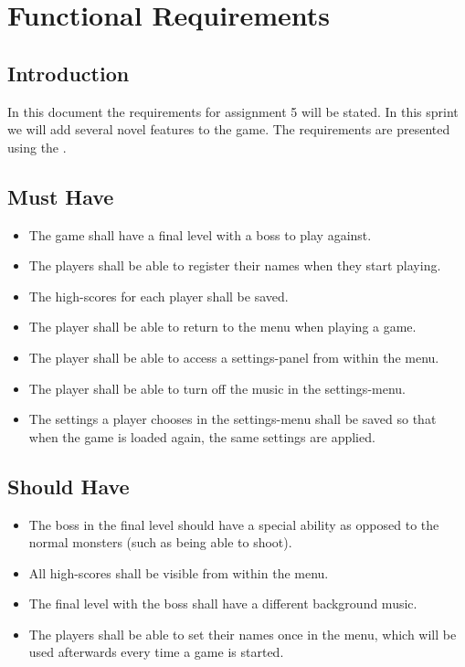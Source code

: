 \chapter{Functional Requirements}

\section{Introduction}
In this document the requirements for assignment 5 will be stated. In this sprint we will add several novel features to the game. \noindent The requirements are presented using the .

\section{Must Have}
\begin{itemize}
\itemsep0em
\item The game shall have a final level with a boss to play against. 
\item The players shall be able to register their names when they start playing.
\item The high-scores for each player shall be saved. 
\item The player shall be able to return to the menu when playing a game. 
\item The player shall be able to access a settings-panel from within the menu. 
\item The player shall be able to turn off the music in the settings-menu. 
\item The settings a player chooses in the settings-menu shall be saved so that when the game is loaded again, the same settings are applied. 
\end{itemize}

\section{Should Have}
\begin{itemize}
\itemsep0em
\item The boss in the final level should have a special ability as opposed to the normal monsters (such as being able to shoot).
\item All high-scores shall be visible from within the menu. 
\item The final level with the boss shall have a different background music. 
\item The players shall be able to set their names once in the menu, which will be used afterwards every time a game is started.  
\end{itemize}

